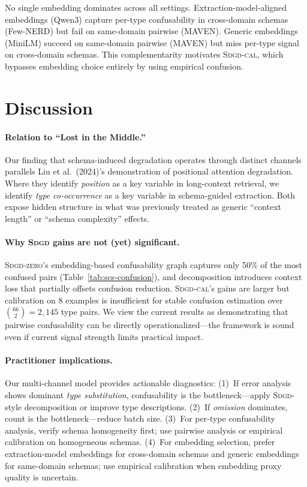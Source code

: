 \documentclass[11pt,a4paper]{article}
\newcommand{\sdgd}{\textsc{Sdgd}}
\newcommand{\sdgdzero}{\textsc{Sdgd-zero}}
\newcommand{\sdgdcal}{\textsc{Sdgd-cal}}
\begin{document}
No single embedding dominates across all settings.
Extraction-model-aligned embeddings (Qwen3) capture per-type confusability in cross-domain schemas (Few-NERD) but fail on same-domain pairwise (MAVEN).
Generic embeddings (MiniLM) succeed on same-domain pairwise (MAVEN) but miss per-type signal on cross-domain schemas.
This complementarity motivates \sdgdcal{}, which bypasses embedding choice entirely by using empirical confusion.

\section{Discussion}
\label{sec:discussion}

\paragraph{Relation to ``Lost in the Middle.''}
Our finding that schema-induced degradation operates through distinct channels parallels Liu et al.\ (2024)'s demonstration of positional attention degradation.
Where they identify \emph{position} as a key variable in long-context retrieval, we identify \emph{type co-occurrence} as a key variable in schema-guided extraction.
Both expose hidden structure in what was previously treated as generic ``context length'' or ``schema complexity'' effects.

\paragraph{Why \sdgd{} gains are not (yet) significant.}
\sdgdzero{}'s embedding-based confusability graph captures only 50\% of the most confused pairs (Table~\ref{tab:scs-confusion}), and decomposition introduces context loss that partially offsets confusion reduction.
\sdgdcal{}'s gains are larger but calibration on 8 examples is insufficient for stable confusion estimation over $\binom{66}{2}{=}2{,}145$ type pairs.
We view the current results as demonstrating that pairwise confusability can be directly operationalized---the framework is sound even if current signal strength limits practical impact.

\paragraph{Practitioner implications.}
Our multi-channel model provides actionable diagnostics:
(1)~If error analysis shows dominant \emph{type substitution}, confusability is the bottleneck---apply \sdgd{}-style decomposition or improve type descriptions.
(2)~If \emph{omission} dominates, count is the bottleneck---reduce batch size.
(3)~For per-type confusability analysis, verify schema homogeneity first; use pairwise analysis or empirical calibration on homogeneous schemas.
(4)~For embedding selection, prefer extraction-model embeddings for cross-domain schemas and generic embeddings for same-domain schemas; use empirical calibration when embedding proxy quality is uncertain.
\end{document}
